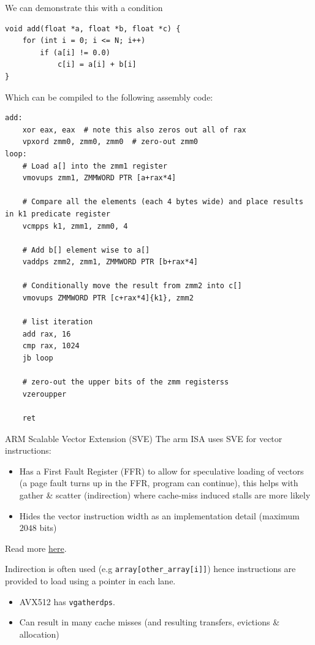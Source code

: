 We can demonstrate this with a condition
\begin{verbatim}
void add(float *a, float *b, float *c) {
    for (int i = 0; i <= N; i++)
        if (a[i] != 0.0)
            c[i] = a[i] + b[i]
}
\end{verbatim}
Which can be compiled to the following assembly code:
\begin{verbatim}
add:
    xor eax, eax  # note this also zeros out all of rax
    vpxord zmm0, zmm0, zmm0  # zero-out zmm0
loop:
    # Load a[] into the zmm1 register
    vmovups zmm1, ZMMWORD PTR [a+rax*4]

    # Compare all the elements (each 4 bytes wide) and place results in k1 predicate register
    vcmpps k1, zmm1, zmm0, 4  

    # Add b[] element wise to a[]
    vaddps zmm2, zmm1, ZMMWORD PTR [b+rax*4]

    # Conditionally move the result from zmm2 into c[]
    vmovups ZMMWORD PTR [c+rax*4]{k1}, zmm2 

    # list iteration
    add rax, 16
    cmp rax, 1024
    jb loop

    # zero-out the upper bits of the zmm registerss
    vzeroupper 

    ret
\end{verbatim}
\begin{sidenotebox}{ARM Scalable Vector Extension (SVE)}
	The arm ISA uses SVE for vector instructions:
	\begin{itemize}
		\item Has a First Fault Register (FFR) to allow for speculative loading of vectors (a page fault turns up in the FFR, program can continue), this helps with gather \& scatter (indirection) where cache-miss induced stalls are more likely
		\item Hides the vector instruction width as an implementation detail (maximum $2048$ bits)
	\end{itemize}
	Read more \href{https://developer.arm.com/documentation/102476/0100}{here}.
\end{sidenotebox}


Indirection is often used (e.g \texttt{array[other_array[i]]}) hence instructions are provided to load using a pointer in each lane.
\begin{itemize}
	\item AVX512  has \texttt{vgatherdps}.
	\item Can result in many cache misses (and resulting transfers, evictions \& allocation)
\end{itemize}

